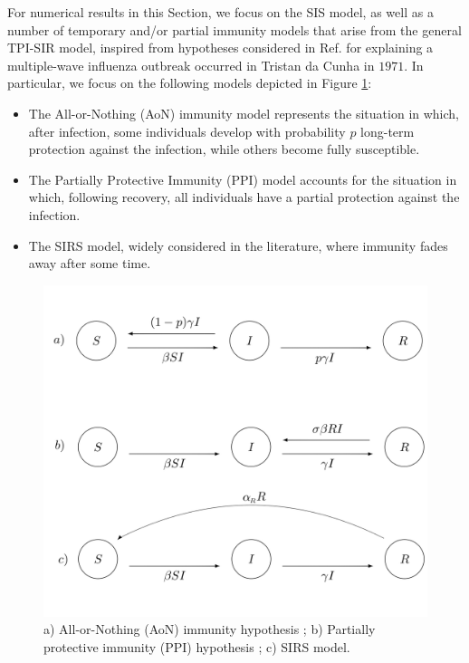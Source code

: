 \documentclass[preprint,12pt]{elsarticle}
\begin{document}
\par For numerical results in this Section, we focus on the SIS model, as well as a number of temporary and/or partial immunity models that arise from the general TPI-SIR model, inspired from hypotheses considered in Ref. \cite{camacho2011explaining} for explaining a multiple-wave influenza outbreak occurred in Tristan da Cunha in $1971$. In particular, we focus on the following models depicted in Figure \ref{fig:models}:
\begin{itemize}
\item The All-or-Nothing (AoN) immunity model \cite{camacho2011explaining} represents the situation in which, after infection, some individuals develop with probability $p$ long-term protection against the infection, while others become fully susceptible.
\item The Partially Protective Immunity (PPI) model \cite{camacho2011explaining} accounts for the situation in which, following recovery, all individuals have a partial protection against the infection.
\item The SIRS model, widely considered in the literature, where immunity fades away after some time.
\end{itemize}

\begin{figure}[h!]
  \centering
 \includegraphics[width=\textwidth]{Figure_Models.jpg}
 \caption{a) All-or-Nothing (AoN) immunity hypothesis \cite{camacho2011explaining}; b) Partially protective immunity (PPI) hypothesis \cite{camacho2011explaining}; c) SIRS model.}
  \label{fig:models}
\end{figure}
\end{document}
